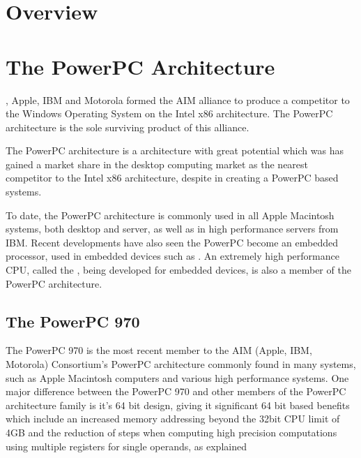 \documentclass[a4paper,12pt]{article}
\begin{document}
\tableofcontents

\section{Overview}

\section{The PowerPC Architecture}

\cite[In 1991]{a3}, Apple, IBM and Motorola formed the AIM alliance to
produce a competitor to the Windows Operating System on the Intel x86
architecture. The PowerPC architecture is the sole surviving product of
this alliance.


The PowerPC architecture is a \cite[RISC based]{a3} architecture with
great potential which was has gained a market share in the desktop
computing market as the nearest competitor to the Intel x86
architecture, despite \cite[troubles experienced by numerous PC
manufactures, such as IBM]{a3} in creating a PowerPC based
systems.


To date, the PowerPC architecture is commonly used in all Apple
Macintosh systems, both desktop and server, as well as in high
performance servers from IBM. Recent developments have also seen the
PowerPC become an embedded processor, used in embedded devices such as
\cite[the Nintendo CameCube, the Microsoft Xbox 2, Cisco dedicated 
networking hardware, and the TiVo set top box.]{a3}. An extremely high
performance CPU, called the \cite[Cell Technology]{a3}, being developed for
embedded devices, is also a member of the PowerPC architecture.

\subsection{The PowerPC 970}

The PowerPC 970 is the most recent member to the AIM (Apple, IBM,
Motorola) Consortium's PowerPC architecture commonly found in many 
systems, such as Apple Macintosh computers and various high 
performance systems. One major difference between the PowerPC 970 and other 
members of the PowerPC architecture family is it's 64 bit design, 
giving it significant 64 bit based benefits which include an 
increased memory addressing beyond the 32bit CPU limit of 4GB and 
the reduction of steps when computing high precision computations 
using multiple registers for single operands, as explained
\cite[here]{a6}
\end{document}
